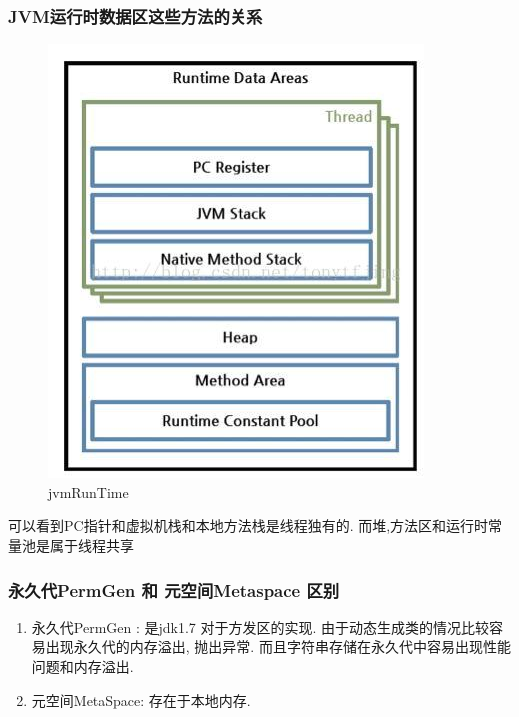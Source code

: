 \subsubsection{JVM运行时数据区这些方法的关系}
\begin{figure}
	\centering
	\includegraphics[width=0.7\linewidth]{figures/jvmRunTime.jpg}
	\caption{jvmRunTime}
	\label{fig:jvmRunTime}
\end{figure}
可以看到PC指针和虚拟机栈和本地方法栈是线程独有的. 而堆,方法区和运行时常量池是属于线程共享
\subsubsection{永久代PermGen 和 元空间Metaspace 区别}
\begin{enumerate}
	\item 永久代PermGen : 是jdk1.7 对于方发区的实现. 由于动态生成类的情况比较容易出现永久代的内存溢出, 抛出异常. 而且字符串存储在永久代中容易出现性能问题和内存溢出.
	\item 元空间MetaSpace: 存在于本地内存.
\end{enumerate}

